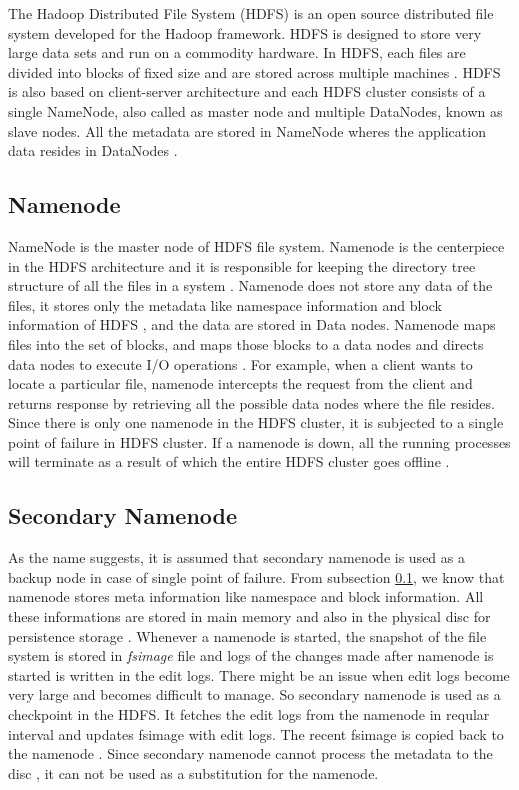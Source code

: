 \documentclass[11pt,a4paper,bibtotoc,idxtotoc,headsepline,footsepline,footexclude,BCOR12mm,DIV13]{scrbook}
\begin{document}
The Hadoop Distributed File System (HDFS) is an open source distributed file system developed for the Hadoop framework. HDFS is designed to store very large data sets and run on a commodity hardware. In HDFS, each files are divided into blocks of fixed size and are stored across multiple machines \cite{HDFS:architecture}. HDFS is also based on client-server architecture and each HDFS cluster consists of a single NameNode, also called as master node and multiple DataNodes, known as slave nodes. All the metadata are stored in NameNode wheres the application data resides in DataNodes \cite{hadoop:architecture}.

\subsection{Namenode}
\label{NameNode}
NameNode is the master node of HDFS file system. Namenode is the centerpiece in the HDFS architecture and it is responsible for keeping the directory tree structure of all the files in a system \cite{HDFS:namenodeanddatanode}. Namenode does not store any data of the files, it stores 
only the metadata like namespace information and block information of HDFS \cite{HDFS:namenodeanddatanode}, and the data are stored in Data nodes. Namenode maps files into the set of blocks, and maps those blocks to a data nodes and directs data nodes to execute I/O operations \cite{HDFS:namenodeanddatanode}. For example, when a client wants to locate a particular file, namenode intercepts the request from the client and returns response by retrieving all the possible data nodes where the file resides. Since there is only one namenode in the HDFS cluster, it is subjected to a single point of failure in HDFS cluster. If a namenode is down, all the running processes will terminate as a result of which the entire HDFS cluster goes offline \cite{HDFS:namenodeanddatanode}.  

\subsection{Secondary Namenode}
\label{SecondaryNameNode}
As the name suggests, it is assumed that secondary namenode is used as a backup node in case of single point of failure. From subsection \ref{NameNode}, we know that namenode stores meta information like namespace and block information. All these informations are stored in main memory and also in the physical disc for persistence storage \cite{HDFS:secondarynamenode}. Whenever a namenode is started, the snapshot of the file system is stored in \emph{fsimage} file and logs of the changes made after namenode is started is written in the edit logs. There might be an issue when edit logs become very large and becomes difficult to manage. So secondary namenode is used as a checkpoint in the HDFS. It fetches the edit logs from the namenode in reqular interval and updates fsimage with edit logs. The recent fsimage is copied back to the namenode \cite{HDFS:secondarynamenode}. Since secondary namenode cannot process the metadata to the disc \cite{HDFS:architecture}, it can not be used as a substitution for the namenode.
\end{document}
